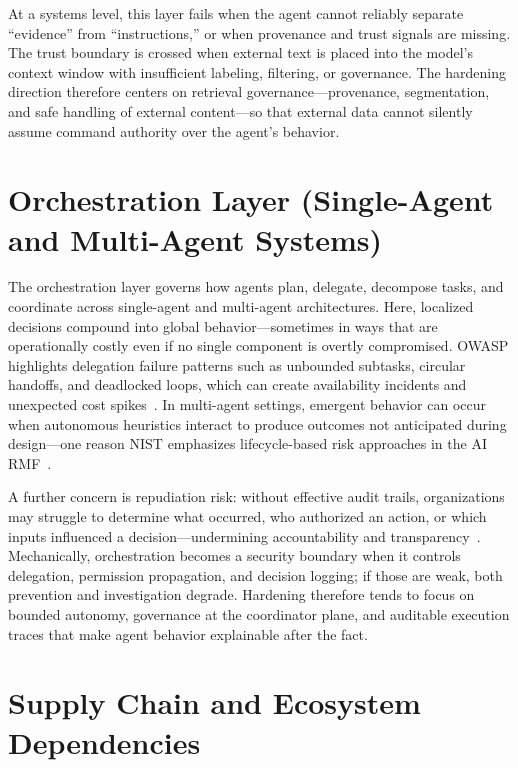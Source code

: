 \begin{TNtwocol}
  \medskip

  At a systems level, this layer fails when the agent cannot reliably separate ``evidence'' from ``instructions,'' or when provenance and trust signals are missing. The trust boundary is crossed when external text is placed into the model's context window with insufficient labeling, filtering, or governance. The hardening direction therefore centers on retrieval governance—provenance, segmentation, and safe handling of external content—so that external data cannot silently assume command authority over the agent's behavior.

  \section{Orchestration Layer (Single-Agent and Multi-Agent Systems)}

  The orchestration layer governs how agents plan, delegate, decompose tasks, and coordinate across single-agent and multi-agent architectures. Here, localized decisions compound into global behavior—sometimes in ways that are operationally costly even if no single component is overtly compromised. OWASP highlights delegation failure patterns such as unbounded subtasks, circular handoffs, and deadlocked loops, which can create availability incidents and unexpected cost spikes~\cite{owasp-top10-llm-2025}. In multi-agent settings, emergent behavior can occur when autonomous heuristics interact to produce outcomes not anticipated during design—one reason NIST emphasizes lifecycle-based risk approaches in the AI RMF~\cite{nist-airmf-100-1}.

  \medskip

  A further concern is repudiation risk: without effective audit trails, organizations may struggle to determine what occurred, who authorized an action, or which inputs influenced a decision—undermining accountability and transparency~\cite{nist-sp800-53b}. Mechanically, orchestration becomes a security boundary when it controls delegation, permission propagation, and decision logging; if those are weak, both prevention and investigation degrade. Hardening therefore tends to focus on bounded autonomy, governance at the coordinator plane, and auditable execution traces that make agent behavior explainable after the fact.

  \section{Supply Chain and Ecosystem Dependencies}


\end{TNtwocol}
